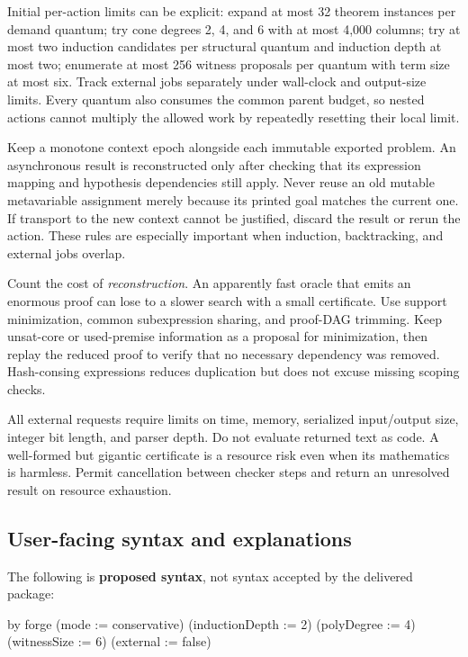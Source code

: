 \documentclass[11pt,a4paper]{article}
\begin{document}
Initial per-action limits can be explicit: expand at most 32 theorem instances
per demand quantum; try cone degrees 2, 4, and 6 with at most 4,000 columns;
try at most two induction candidates per structural quantum and induction depth
at most two; enumerate at most 256 witness proposals per quantum with term size
at most six. Track external jobs separately under wall-clock and output-size
limits. Every quantum also consumes the common parent budget, so nested actions
cannot multiply the allowed work by repeatedly resetting their local limit.

Keep a monotone context epoch alongside each immutable exported problem. An
asynchronous result is reconstructed only after checking that its expression
mapping and hypothesis dependencies still apply. Never reuse an old mutable
metavariable assignment merely because its printed goal matches the current
one. If transport to the new context cannot be justified, discard the result
or rerun the action. These rules are especially important when induction,
backtracking, and external jobs overlap.

Count the cost of \emph{reconstruction}. An apparently fast oracle that emits
an enormous proof can lose to a slower search with a small certificate. Use
support minimization, common subexpression sharing, and proof-DAG trimming.
Keep unsat-core or used-premise information as a proposal for minimization,
then replay the reduced proof to verify that no necessary dependency was
removed. Hash-consing expressions reduces duplication but does not excuse
missing scoping checks.

All external requests require limits on time, memory, serialized input/output
size, integer bit length, and parser depth. Do not evaluate returned text as
code. A well-formed but gigantic certificate is a resource risk even when its
mathematics is harmless. Permit cancellation between checker steps and return
an unresolved result on resource exhaustion.

\subsection{User-facing syntax and explanations}

The following is \textbf{proposed syntax}, not syntax accepted by the delivered
package:
\begin{Code}
by
  forge (mode := conservative)
    (inductionDepth := 2)
    (polyDegree := 4)
    (witnessSize := 6)
    (external := false)
\end{Code}
\end{document}
